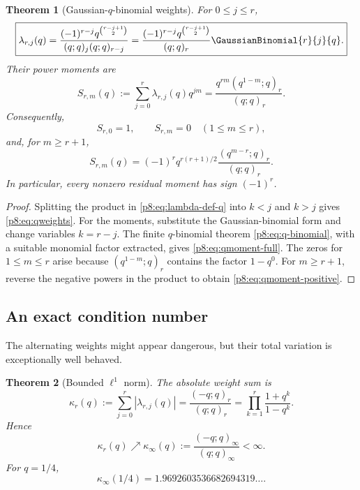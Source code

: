 \documentclass[11pt]{article}
\numberwithin{equation}{section}
\newtheorem{theorem}{Theorem}[section]
\theoremstyle{definition}
\theoremstyle{remark}
\begin{document}
\begin{theorem}[Gaussian-$q$-binomial weights]
\label{p8:thm:qweights}
For $0\le j\le r$,
\begin{equation}
\boxed{
\lambda_{r,j}(q)
=\frac{(-1)^{r-j}q^{\binom{r-j+1}{2}}}
{(q;q)_j(q;q)_{r-j}}
=\frac{(-1)^{r-j}q^{\binom{r-j+1}{2}}}{(q;q)_r}
\GaussianBinomial{r}{j}{q}.}
\label{p8:eq:qweights}
\end{equation}
Their power moments are
\begin{equation}
S_{r,m}(q):=\sum_{j=0}^{r}\lambda_{r,j}(q)q^{jm}
=\frac{q^{rm}(q^{1-m};q)_r}{(q;q)_r}.
\label{p8:eq:qmoment-full}
\end{equation}
Consequently,
\begin{equation}
S_{r,0}=1,
\qquad S_{r,m}=0\quad(1\le m\le r),
\label{p8:eq:qmoment-cancel}
\end{equation}
and, for $m\ge r+1$,
\begin{equation}
S_{r,m}(q)
=(-1)^r q^{r(r+1)/2}
\frac{(q^{m-r};q)_r}{(q;q)_r}.
\label{p8:eq:qmoment-positive}
\end{equation}
In particular, every nonzero residual moment has sign $(-1)^r$.
\end{theorem}

\begin{proof}
Splitting the product in \cref{p8:eq:lambda-def-q} into $k<j$ and $k>j$ gives \cref{p8:eq:qweights}. For the moments, substitute the Gaussian-binomial form and change variables $k=r-j$. The finite $q$-binomial theorem \cref{p8:eq:q-binomial}, with a suitable monomial factor extracted, gives \cref{p8:eq:qmoment-full}. The zeros for $1\le m\le r$ arise because $(q^{1-m};q)_r$ contains the factor $1-q^0$. For $m\ge r+1$, reverse the negative powers in the product to obtain \cref{p8:eq:qmoment-positive}.
\end{proof}

\subsection{An exact condition number}

The alternating weights might appear dangerous, but their total variation is exceptionally well behaved.

\begin{theorem}[Bounded $\ell^1$ norm]
\label{p8:thm:qcondition}
The absolute weight sum is
\begin{equation}
\kappa_r(q):=\sum_{j=0}^{r}|\lambda_{r,j}(q)|
=\frac{(-q;q)_r}{(q;q)_r}
=\prod_{k=1}^{r}\frac{1+q^k}{1-q^k}.
\label{p8:eq:qcondition}
\end{equation}
Hence
\begin{equation}
\kappa_r(q)\nearrow \kappa_\infty(q)
:=\frac{(-q;q)_\infty}{(q;q)_\infty}<\infty.
\label{p8:eq:qcondition-limit}
\end{equation}
For $q=1/4$,
\begin{equation}
\kappa_\infty(1/4)=1.9692603536682694319\ldots.
\label{p8:eq:qcondition-dyadic}
\end{equation}
\end{theorem}
\end{document}
